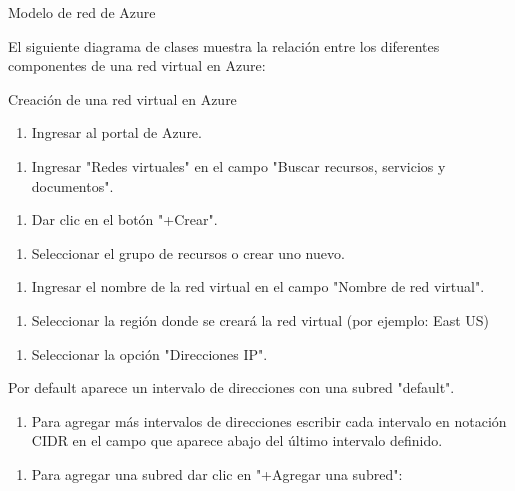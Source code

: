 Modelo de red de Azure

El siguiente diagrama de clases muestra la relación entre los diferentes componentes de una red virtual en Azure:

Creación de una red virtual en Azure

\begin{enumerate}
\item Ingresar al portal de Azure.
\end{enumerate}

\begin{enumerate}
\item Ingresar "Redes virtuales" en el campo "Buscar recursos, servicios y documentos".
\end{enumerate}

\begin{enumerate}
\item Dar clic en el botón "+Crear".
\end{enumerate}

\begin{enumerate}
\item Seleccionar el grupo de recursos o crear uno nuevo.
\end{enumerate}

\begin{enumerate}
\item Ingresar el nombre de la red virtual en el campo "Nombre de red virtual".
\end{enumerate}

\begin{enumerate}
\item Seleccionar la región donde se creará la red virtual (por ejemplo: East US)
\end{enumerate}

\begin{enumerate}
\item Seleccionar la opción "Direcciones IP".
\end{enumerate}

Por default aparece un intervalo de direcciones con una subred "default".

\begin{enumerate}
\item Para agregar más intervalos de direcciones escribir cada intervalo en notación CIDR en el campo que aparece abajo del último intervalo definido.
\end{enumerate}

\begin{enumerate}
\item Para agregar una subred dar clic en "+Agregar una subred":
\end{enumerate}

